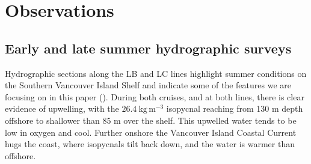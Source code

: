 \documentclass[draft]{agujournal2019}
\begin{document}
\section{Observations}
\label{sec:Observations}

\subsection{Early and late summer hydrographic surveys}

Hydrographic sections along the LB and LC lines highlight summer conditions on the Southern Vancouver Island Shelf and indicate some of the features we are focusing on in this paper ().  During both cruises, and at both lines, there is clear evidence of upwelling, with the $26.4\ \mathrm{kg\,m^{-3}}$ isopycnal reaching from 130 m depth offshore to shallower than 85 m over the shelf.  This upwelled water tends to be low in oxygen and cool. Further onshore the Vancouver Island Coastal Current hugs the coast, where isopycnals tilt back down, and the water is warmer than offshore.
\end{document}
